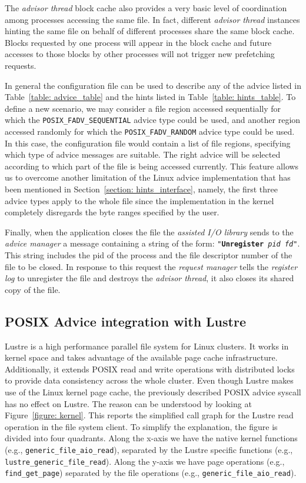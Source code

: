 The \textit{advisor thread} block cache also provides a very basic level of coordination among processes accessing the same file. In fact, different \textit{advisor thread} instances hinting the same file on behalf of different processes share the same block 
cache. Blocks requested by one process will appear in the block cache and future accesses to those blocks by other processes will not trigger new prefetching requests.

In general the configuration file can be used to describe any of the advice listed in Table~\ref{table: advice_table} and the hints listed in Table~\ref{table: hints_table}. To define a new scenario, we may consider a file region accessed sequentially for which 
the \texttt{POSIX\_FADV\_SEQUENTIAL} advice type could be used, and another region accessed randomly for which the \texttt{POSIX\_FADV\_RANDOM} advice type could be used. In this case, the configuration file would contain a list of file regions, specifying which 
type of advice messages are suitable. The right advice will be selected according to which part of the file is being accessed currently. This feature allows us to overcome another limitation of the Linux advice implementation that has been mentioned in 
Section~\ref{section: hints_interface}, namely, the first three advice types apply to the whole file since the implementation in the kernel completely disregards the byte ranges specified by the user.
 
Finally, when the application closes the file the \textit{assisted I/O library} sends to the \textit{advice manager} a message containing a string of the form: \texttt{"\textbf{Unregister} \textit{pid} \textit{fd}"}. This string includes the pid of the process 
and the file descriptor number of the file to be closed. In response to this request the \textit{request manager} tells the \textit{register log} to unregister the file and destroys the \textit{advisor thread}, it also closes its shared copy of the file.

\subsection{POSIX Advice integration with Lustre}
Lustre is a high performance parallel file system for Linux clusters. It works in kernel space and takes advantage of the available page cache infrastructure. Additionally, it extends POSIX read and write operations with distributed locks to provide data 
consistency across the whole cluster. Even though Lustre makes use of the Linux kernel page cache, the previously described POSIX advice syscall has no effect on Lustre. The reason can be understood by looking at Figure~\ref{figure: kernel}. This reports 
the simplified call graph for the Lustre read operation in the file system client. To simplify the explanation, the figure is divided into four quadrants. Along the x-axis we have the native kernel functions (e.g., \texttt{generic\_file\_aio\_read}), separated 
by the Lustre specific functions (e.g., \texttt{lustre\_generic\_file\_read}). Along the y-axis we have page operations (e.g., \texttt{find\_get\_page}) separated by the file operations (e.g., \texttt{generic\_file\_aio\_read}). 

